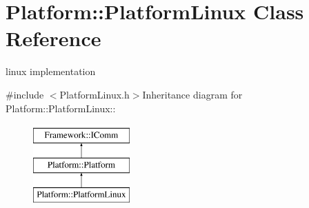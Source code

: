 \hypertarget{classPlatform_1_1PlatformLinux}{
\section{Platform::PlatformLinux Class Reference}
\label{classPlatform_1_1PlatformLinux}
}


linux implementation  


{\ttfamily \#include $<$PlatformLinux.h$>$}Inheritance diagram for Platform::PlatformLinux::\begin{figure}[H]
\begin{center}
\leavevmode
\includegraphics[height=3cm]{classPlatform_1_1PlatformLinux}
\end{center}
\end{figure}
